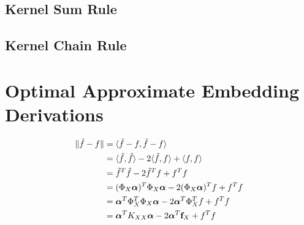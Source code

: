 \documentclass[twoside]{article} \usepackage{aistats2017}
\theoremstyle{definition}
\newcommand{\ds}[1]{{#1}}
\begin{document}
	\subsection{Kernel Sum Rule}
	
	\subsection{Kernel Chain Rule}
	
\section{Optimal Approximate Embedding Derivations}

		\begin{equation}
		\begin{aligned}
			\Vert \hat{f} - f \Vert &= \langle \hat{f} - f, \hat{f} - f \rangle \\
			&= \langle \hat{f}, \hat{f} \rangle - 2 \langle \hat{f}, f \rangle + \langle f, f \rangle \\
			&=  \hat{f}^{T} \hat{f} - 2 \hat{f}^{T} f + f^{T} f \\
			&= (\Phi_{\ds{X}} \bm{\alpha})^{T} \Phi_{\ds{X}}  \bm{\alpha} - 2 (\Phi_{\ds{X}}  \bm{\alpha})^{T} f + f^{T} f \\
			&= \bm{\alpha}^{T} \Phi_{\ds{X}} ^{T} \Phi_{\ds{X}}  \bm{\alpha} - 2 \bm{\alpha}^{T} \Phi_{\ds{X}} ^{T} f + f^{T} f \\
			&= \bm{\alpha}^{T} K_{\ds{X} \ds{X}}  \bm{\alpha} - 2 \bm{\alpha}^{T} \bvec{f}_{\ds{X}} + f^{T} f \\
			\end{aligned}
		\label{eq:approximate_embedding_derivation}
		\end{equation}
\end{document}
